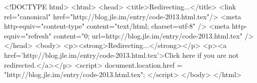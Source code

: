 <!DOCTYPE html>
<html>
<head>
<title>Redirecting...</title>
<link rel="canonical" href="http://blog.jle.im/entry/code-2013.html.tex"/>
<meta http-equiv="content-type" content="text/html; charset=utf-8" />
<meta http-equiv="refresh" content="0; url=http://blog.jle.im/entry/code-2013.html.tex" />
</head>
<body>
  <p><strong>Redirecting...</strong></p>
  <p><a href='http://blog.jle.im/entry/code-2013.html.tex'>Click here if you are not redirected.</a></p>
  <script>
    document.location.href = "http://blog.jle.im/entry/code-2013.html.tex";
  </script>
</body>
</html>
